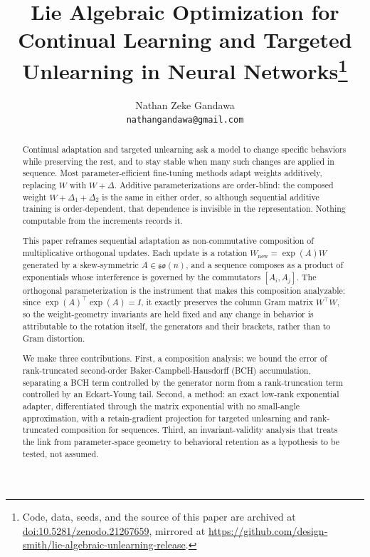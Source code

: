 \documentclass[
]{article}
\title{Lie Algebraic Optimization for Continual Learning and Targeted Unlearning in Neural Networks\thanks{Code, data, seeds, and the source of this paper are archived at \href{https://doi.org/10.5281/zenodo.21267659}{doi:10.5281/zenodo.21267659}, mirrored at \url{https://github.com/design-smith/lie-algebraic-unlearning-release}.}}
\author{Nathan Zeke Gandawa\\ \texttt{nathangandawa@gmail.com}}
\date{}
\begin{document}
\maketitle

\begin{abstract}

Continual adaptation and targeted unlearning ask a model to change specific behaviors while preserving the rest, and to stay stable when many such changes are applied in sequence. Most parameter-efficient fine-tuning methods adapt weights additively, replacing \(W\) with \(W+\Delta\). Additive parameterizations are order-blind: the composed weight \(W+\Delta_1+\Delta_2\) is the same in either order, so although sequential additive training is order-dependent, that dependence is invisible in the representation. Nothing computable from the increments records it.

This paper reframes sequential adaptation as non-commutative composition of multiplicative orthogonal updates. Each update is a rotation \(W_{\mathrm{new}}=\exp(A)W\) generated by a skew-symmetric \(A\in\mathfrak{so}(n)\), and a sequence composes as a product of exponentials whose interference is governed by the commutators \([A_i,A_j]\). The orthogonal parameterization is the instrument that makes this composition analyzable: since \(\exp(A)^\top\exp(A)=I\), it exactly preserves the column Gram matrix \(W^\top W\), so the weight-geometry invariants are held fixed and any change in behavior is attributable to the rotation itself, the generators and their brackets, rather than to Gram distortion.

We make three contributions. First, a composition analysis: we bound the error of rank-truncated second-order Baker-Campbell-Hausdorff (BCH) accumulation, separating a BCH term controlled by the generator norm from a rank-truncation term controlled by an Eckart-Young tail. Second, a method: an exact low-rank exponential adapter, differentiated through the matrix exponential with no small-angle approximation, with a retain-gradient projection for targeted unlearning and rank-truncated composition for sequences. Third, an invariant-validity analysis that treats the link from parameter-space geometry to behavioral retention as a hypothesis to be tested, not assumed.


\end{abstract}
\end{document}
